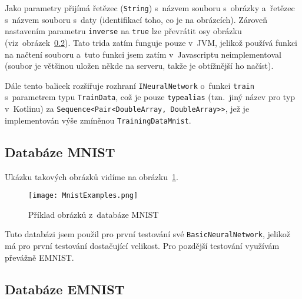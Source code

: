 \documentclass[12pt]{report}			%
\newcommand{\glsref}[1]{\glsdisp{#1}{\phantom{}}}
\begin{document}
				Jako parametry přijímá řetězec (\verb!String!) s~názvem souboru s~obrázky a~řetězec s~názvem souboru s~daty (identifikací toho, co je na obrázcích). Zároveň nastavením parametru \verb!inverse! na \glsref{true}\verb!true! lze převrátit osy obrázku (viz~obrázek~\ref{EMNIST}). Tato \gls{trida} zatím funguje pouze v~\gls{JVM}, jelikož používá funkci na načtení souboru a~tuto funkci jsem zatím v~Javascriptu neimplementoval (soubor je většinou uložen někde na serveru, takže je obtížnější ho načíst).
				
				Dále tento \gls{balicek} rozšiřuje rozhraní \verb!INeuralNetwork! o~funkci \verb!train! s~parametrem \gls{typ}u \verb!TrainData!, což je pouze \verb!typealias! (tzn.~jiný název pro \gls{typ} v~\gls{Kotlin}u) za \glsref{DoubleArray}\glsref{Pair}\verb!Sequence<Pair<DoubleArray, DoubleArray>>!, jež je implementován výše zmíněnou  \verb!TrainingDataMnist!.
				
				\subsection{Databáze MNIST}
					 \parencite[přeloženo]{online:MNIST} Ukázku takových obrázků vidíme na obrázku~\ref{fig:MNIST}.
					
					\begin{figure}
						\texttt{[image: MnistExamples.png]}
						\caption{Příklad obrázků z~databáze MNIST \autocite{wiki:MNIST}}
						\label{fig:MNIST}
					\end{figure}
					
					Tuto databázi jsem použil pro první testování své \verb!BasicNeuralNetwork!, jelikož má pro první testování dostačující velikost. Pro pozdější testování využívám převážně EMNIST.
				\subsection{Databáze EMNIST} \label{EMNIST}
					 \parencite[přeloženo]{article:EMNIST}
					
\end{document}
